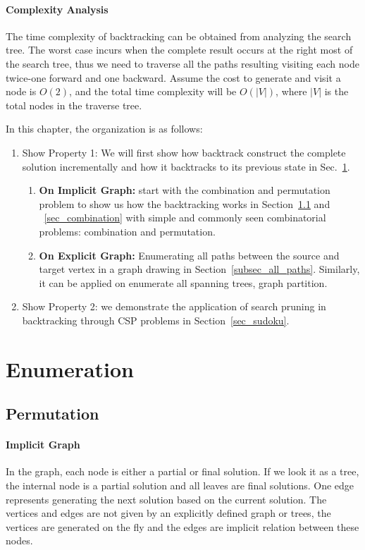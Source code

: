 \documentclass[../main.tex]{subfiles}
\begin{document}
\paragraph{Complexity Analysis} The time complexity of backtracking can be obtained from analyzing the search tree. The worst case incurs when the complete result occurs at the right most of the search tree, thus we need to traverse all the paths resulting visiting each node twice-one forward and one backward. Assume the cost to generate and visit a node is $O(2)$, and the total time complexity will be $O(|V|)$, where $|V|$ is the total nodes in the traverse tree. 






In this chapter, the organization is as follows:
\begin{enumerate}
    \item Show Property 1: We will first show how backtrack construct the complete solution incrementally and how it backtracks to its previous state in Sec.~\ref{sec_enumeration}. 
    \begin{enumerate}
        \item \textbf{On Implicit Graph:} start with the combination and permutation problem to show us how the backtracking works in Section~\ref{backtrack_permutation} and ~\ref{sec_combination} with simple and commonly seen combinatorial problems: combination and permutation.
        \item \textbf{On Explicit Graph:} Enumerating all paths between the source and target vertex in a graph drawing in Section~\ref{subsec_all_paths}. Similarly, it can be applied on enumerate all spanning trees, graph partition.   
        \end{enumerate}
    \item  Show  Property 2: we demonstrate the application of search pruning in backtracking through CSP problems in Section~\ref{sec_sudoku}.
\end{enumerate}
\section{Enumeration}
\label{sec_enumeration}
\subsection{Permutation}
\label{backtrack_permutation}


\paragraph{Implicit Graph} In the graph, each node is either a partial or final solution. If we look it as a tree, the internal node is a partial solution and all leaves are final solutions. One edge represents generating the next solution based on the current solution. The vertices and edges are not given by an explicitly defined graph or trees, the vertices are generated on the fly and the edges are implicit relation between these nodes. 
\end{document}
